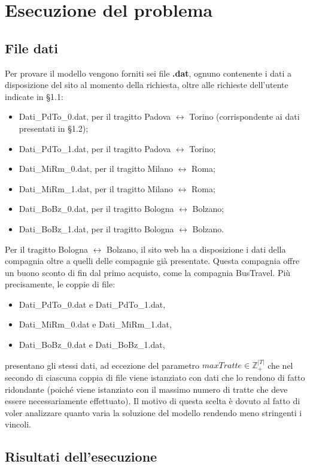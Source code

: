 \documentclass[main.tex]{subfiles}
\begin{document}
\section{Esecuzione del problema}
\subsection{File dati}
Per provare il modello vengono forniti sei file \textbf{.dat}, ognuno contenente i dati a disposizione del sito al momento della richiesta, oltre alle richieste
dell'utente indicate in §1.1:
\begin{itemize}
    \item Dati\_PdTo\_0.dat, per il tragitto Padova $\leftrightarrow$ Torino (corrispondente ai dati presentati in §1.2);
    \item Dati\_PdTo\_1.dat, per il tragitto Padova $\leftrightarrow$ Torino;
    \item Dati\_MiRm\_0.dat, per il tragitto Milano $\leftrightarrow$ Roma;
    \item Dati\_MiRm\_1.dat, per il tragitto Milano $\leftrightarrow$ Roma;
    \item Dati\_BoBz\_0.dat, per il tragitto Bologna $\leftrightarrow$ Bolzano;
    \item Dati\_BoBz\_1.dat, per il tragitto Bologna $\leftrightarrow$ Bolzano.
\end{itemize}
Per il tragitto Bologna $\leftrightarrow$ Bolzano, il sito web ha a disposizione i dati della compagnia oltre a quelli delle compagnie già presentate. 
Questa compagnia offre un buono sconto di  fin dal primo acquisto, come la compagnia BusTravel.
Più precisamente, le coppie di file:
\begin{itemize}
    \item Dati\_PdTo\_0.dat e Dati\_PdTo\_1.dat,
    \item Dati\_MiRm\_0.dat e Dati\_MiRm\_1.dat,
    \item Dati\_BoBz\_0.dat e Dati\_BoBz\_1.dat,
\end{itemize}
presentano gli stessi dati, ad eccezione del parametro $maxTratte \in \mathbb{Z}_+^{|T|}$ che nel secondo di ciascuna coppia di file viene istanziato 
con dati che lo rendono di fatto ridondante (poiché viene istanziato con il massimo numero di tratte che deve essere necessariamente effettuato).
Il motivo di questa scelta è dovuto al fatto di voler analizzare quanto varia la soluzione del modello rendendo meno stringenti i vincoli.

\subsection{Risultati dell'esecuzione}
\end{document}
